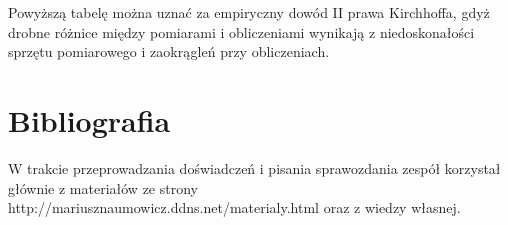 \documentclass[polish,a4paper]{article}
\begin{document}
\begin{flushleft}
Powyższą tabelę można uznać za empiryczny dowód II prawa Kirchhoffa, gdyż drobne różnice między pomiarami i obliczeniami wynikają z niedoskonałości sprzętu pomiarowego i zaokrągleń przy obliczeniach.
\end{flushleft}


\section{Bibliografia}
W trakcie przeprowadzania doświadczeń i pisania sprawozdania zespół korzystał głównie z materiałów ze strony http://mariusznaumowicz.ddns.net/materialy.html oraz z wiedzy własnej.



\end{document}
